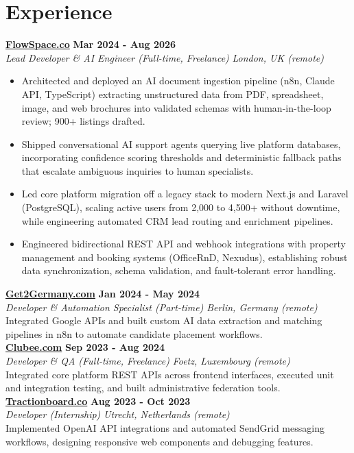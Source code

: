 \documentclass[a4paper,10pt]{article}
\newcommand{\role}[4]{%
 \textbf{#1} \hfill \textbf{#2}\\[1pt]%
 \textit{#3} \hfill \textit{#4}\\[2pt]%
}
\begin{document}
\section{Experience}

\role{\href{https://flowspace.co}{FlowSpace.co}}{Mar 2024 - Aug 2026}{Lead Developer \& AI Engineer (Full-time, Freelance)}{London, UK (remote)}
\begin{itemize}
 \item Architected and deployed an AI document ingestion pipeline (n8n, Claude API, TypeScript) extracting unstructured data from PDF, spreadsheet, image, and web brochures into validated schemas with human-in-the-loop review; 900+ listings drafted.
 \item Shipped conversational AI support agents querying live platform databases, incorporating confidence scoring thresholds and deterministic fallback paths that escalate ambiguous inquiries to human specialists.
 \item Led core platform migration off a legacy stack to modern Next.js and Laravel (PostgreSQL), scaling active users from 2,000 to 4,500+ without downtime, while engineering automated CRM lead routing and enrichment pipelines.
 \item Engineered bidirectional REST API and webhook integrations with property management and booking systems (OfficeRnD, Nexudus), establishing robust data synchronization, schema validation, and fault-tolerant error handling.
\end{itemize}

\role{\href{https://get2germany.com}{Get2Germany.com}}{Jan 2024 - May 2024}{Developer \& Automation Specialist (Part-time)}{Berlin, Germany (remote)}
Integrated Google APIs and built custom AI data extraction and matching pipelines in n8n to automate candidate placement workflows.\\[1pt]

\role{\href{https://clubee.com}{Clubee.com}}{Sep 2023 - Aug 2024}{Developer \& QA (Full-time, Freelance)}{Foetz, Luxembourg (remote)}
Integrated core platform REST APIs across frontend interfaces, executed unit and integration testing, and built administrative federation tools.\\[1pt]

\role{\href{https://tractionboard.co}{Tractionboard.co}}{Aug 2023 - Oct 2023}{Developer (Internship)}{Utrecht, Netherlands (remote)}
Implemented OpenAI API integrations and automated SendGrid messaging workflows, designing responsive web components and debugging features.
\end{document}
